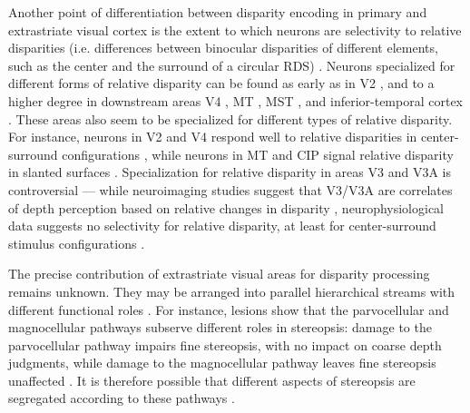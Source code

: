 Another point of differentiation between disparity encoding in primary and extrastriate visual cortex is the extent to which neurons are selectivity to relative disparities (i.e. differences between binocular disparities of different elements, such as the center and the surround of a circular RDS) \cite{Cumming:2000vn}. Neurons specialized for different forms of relative disparity can be found as early as in V2 \cite{Thomas:2002ud}, and to a higher degree in downstream areas V4 \cite{Umeda:2007vn}, MT \cite{Nguyenkim:2003if}, MST \cite{Roy:1992kc,Roy:1990hs}, and inferior-temporal cortex \cite{Janssen:1999nx,Janssen:2000oq}. These areas also seem to be specialized for different types of relative disparity. For instance, neurons in V2 and V4 respond well to relative disparities in center-surround configurations \cite{Thomas:2002ud,Umeda:2007vn}, while neurons in MT and CIP signal relative disparity in slanted surfaces \cite{Nguyenkim:2003if,Rosenberg:2013fk}. Specialization for relative disparity in areas V3 and V3A is controversial --- while neuroimaging studies suggest that V3/V3A are correlates of depth perception based on relative changes in disparity \cite{Backus:2001ly,Tsao:2003lk,Ban:2015cr}, neurophysiological data suggests no selectivity for relative disparity, at least for center-surround stimulus configurations \cite{Anzai:2011gb}.

The precise contribution of extrastriate visual areas for disparity processing remains unknown. They may be arranged into parallel hierarchical streams with different functional roles \cite{Tyler:1990gb}. For instance, lesions show that the parvocellular and magnocellular pathways subserve different roles in stereopsis: damage to the parvocellular pathway impairs fine stereopsis, with no impact on coarse depth judgments, while damage to the magnocellular pathway leaves fine stereopsis unaffected \cite{Schiller:1990sh}. It is therefore possible that different aspects of stereopsis are segregated according to these pathways \cite{Tyler:1990gb}.

